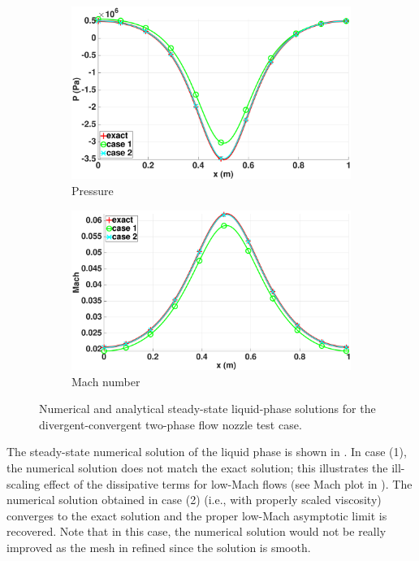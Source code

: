 \begin{figure}[H]
        \begin{subfigure}[b]{0.495\textwidth}
                \centering
                \includegraphics[width=\textwidth]{figures/liquid_pressure_llf_and_exact_100.eps}
                \caption{Pressure}
                \label{fig:liq-phase-press}
        \end{subfigure}        
        \begin{subfigure}[b]{0.495\textwidth}
                \centering
                \includegraphics[width=\textwidth]{figures/liquid_mach_llf_and_exact_100.eps}
                \caption{Mach number}
                \label{fig:liq-phase-mach}
        \end{subfigure}
        \caption{Numerical and analytical steady-state liquid-phase solutions for the divergent-convergent two-phase flow nozzle test case.}\label{fig:liq-phase}
\end{figure}
%
The steady-state numerical solution of the liquid phase is shown in .
In case (1), the numerical solution does not match the exact solution; this illustrates the ill-scaling effect of the 
dissipative terms for low-Mach flows (see Mach plot in  ). The numerical solution obtained in case (2)
(i.e., with properly scaled viscosity) converges to the exact solution and the proper low-Mach asymptotic limit is recovered. 
Note that in this case, the numerical solution would not be really improved as the mesh in refined since the solution is smooth. 
%
